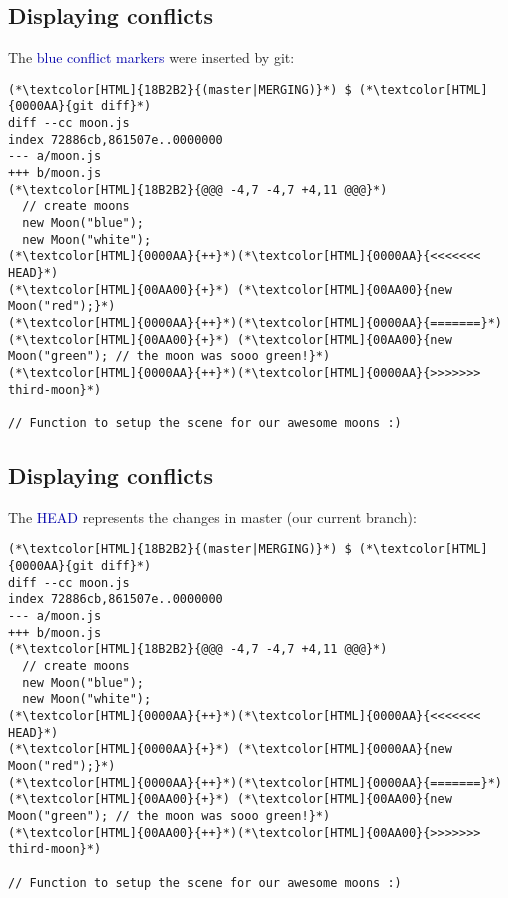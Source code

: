 \subsection{Displaying conflicts}
\begin{frame}[fragile]
  \subslidetitle

  The \textcolor[HTML]{0000AA}{blue conflict markers} were inserted by git:
  \begin{lstlisting}
(*\textcolor[HTML]{18B2B2}{(master|MERGING)}*) $ (*\textcolor[HTML]{0000AA}{git diff}*)
diff --cc moon.js
index 72886cb,861507e..0000000
--- a/moon.js
+++ b/moon.js
(*\textcolor[HTML]{18B2B2}{@@@ -4,7 -4,7 +4,11 @@@}*)
  // create moons
  new Moon("blue");
  new Moon("white");
(*\textcolor[HTML]{0000AA}{++}*)(*\textcolor[HTML]{0000AA}{<<<<<<< HEAD}*)
(*\textcolor[HTML]{00AA00}{+}*) (*\textcolor[HTML]{00AA00}{new Moon("red");}*)
(*\textcolor[HTML]{0000AA}{++}*)(*\textcolor[HTML]{0000AA}{=======}*)
(*\textcolor[HTML]{00AA00}{+}*) (*\textcolor[HTML]{00AA00}{new Moon("green"); // the moon was sooo green!}*)
(*\textcolor[HTML]{0000AA}{++}*)(*\textcolor[HTML]{0000AA}{>>>>>>> third-moon}*)

// Function to setup the scene for our awesome moons :)
\end{lstlisting}
\end{frame}

\subsection{Displaying conflicts}
\begin{frame}[fragile]
  \subslidetitle

  The \textcolor[HTML]{0000AA}{HEAD} represents the changes in master (our current branch):
  \begin{lstlisting}
(*\textcolor[HTML]{18B2B2}{(master|MERGING)}*) $ (*\textcolor[HTML]{0000AA}{git diff}*)
diff --cc moon.js
index 72886cb,861507e..0000000
--- a/moon.js
+++ b/moon.js
(*\textcolor[HTML]{18B2B2}{@@@ -4,7 -4,7 +4,11 @@@}*)
  // create moons
  new Moon("blue");
  new Moon("white");
(*\textcolor[HTML]{0000AA}{++}*)(*\textcolor[HTML]{0000AA}{<<<<<<< HEAD}*)
(*\textcolor[HTML]{0000AA}{+}*) (*\textcolor[HTML]{0000AA}{new Moon("red");}*)
(*\textcolor[HTML]{0000AA}{++}*)(*\textcolor[HTML]{0000AA}{=======}*)
(*\textcolor[HTML]{00AA00}{+}*) (*\textcolor[HTML]{00AA00}{new Moon("green"); // the moon was sooo green!}*)
(*\textcolor[HTML]{00AA00}{++}*)(*\textcolor[HTML]{00AA00}{>>>>>>> third-moon}*)

// Function to setup the scene for our awesome moons :)
\end{lstlisting}
\end{frame}


